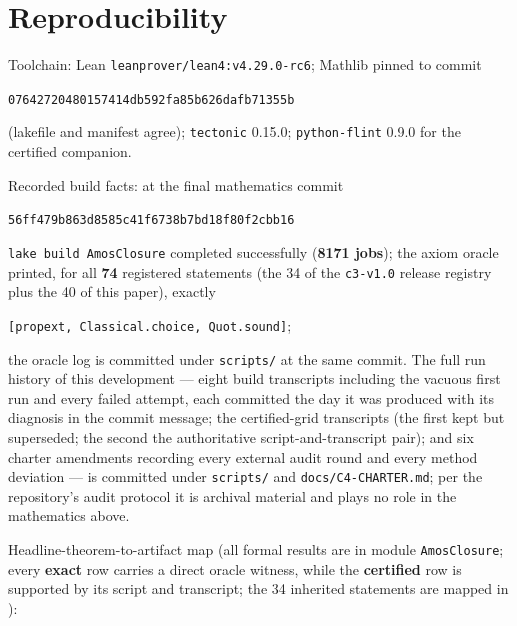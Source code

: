 \documentclass[11pt]{article}
\newcommand{\lean}[1]{\texttt{#1}}
\begin{document}
\section{Reproducibility}\label{sec:repro}

Toolchain: Lean \lean{leanprover/lean4:v4.29.0-rc6}; Mathlib pinned
to commit
\begin{center}\small
\lean{07642720480157414db592fa85b626dafb71355b}
\end{center}
\noindent (lakefile and manifest agree); \lean{tectonic} 0.15.0;
\lean{python-flint} 0.9.0 for the certified companion.

\medskip
\noindent Recorded build facts: at the final mathematics commit
\begin{center}\small
\lean{56ff479b863d8585c41f6738b7bd18f80f2cbb16}
\end{center}
\noindent \lean{lake build AmosClosure} completed successfully
(\textbf{8171 jobs}); the axiom oracle printed, for all \textbf{74}
registered statements (the 34 of the \lean{c3-v1.0} release
registry plus the 40 of this paper), exactly
\begin{center}
\lean{[propext, Classical.choice, Quot.sound]};
\end{center}
\noindent the oracle log is committed under \lean{scripts/} at the
same commit.  The full run history of this development --- eight
build transcripts including the vacuous first run and every failed
attempt, each committed the day it was produced with its diagnosis
in the commit message; the certified-grid transcripts (the
first kept but superseded; the second the authoritative
script-and-transcript pair); and six
charter amendments recording every external audit round and every
method deviation --- is committed under \lean{scripts/} and
\lean{docs/C4-CHARTER.md}; per the repository's audit protocol it is
archival material and plays no role in the mathematics above.

\medskip
\noindent Headline-theorem-to-artifact map (all formal results are
in module \lean{AmosClosure}; every \textbf{exact} row carries a
direct oracle witness, while the \textbf{certified} row is supported
by its script and transcript; the 34 inherited statements are mapped
in \cite{ErikssonC2,ErikssonC3}):
\end{document}

